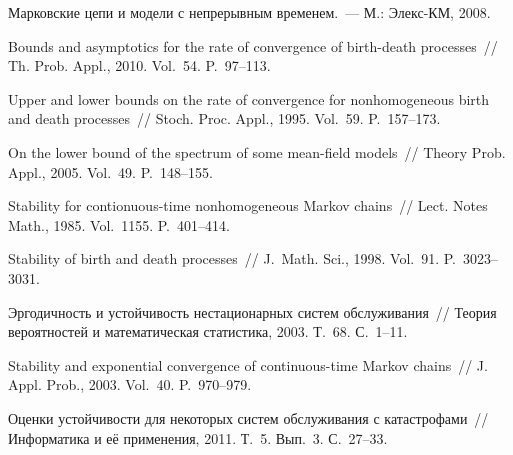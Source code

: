 \begin{multicols}{2}
{{\begin{thebibliography}{99}
Марковские цепи и модели с непрерывным временем.~--- М.: Элекс-КМ, 2008.

Bounds and asymptotics for the rate of convergence of birth-death processes~//  
Th. Prob. Appl., 2010. Vol.~54. P.~97--113.

 Upper and lower bounds on the rate of
convergence for nonhomogeneous birth and death processes~//  Stoch.
Proc. Appl., 1995. Vol.~59. P.~157--173.

 On the lower bound of the spectrum
 of some mean-field models~// Theory Prob. Appl., 2005. Vol.~49. P.~148--155.
 
 Stability for contionuous-time
nonhomogeneous Markov chains~// Lect. Notes Math.,  1985. Vol.~1155.
P.~401--414.

 Stability of birth and death processes~// 
J.~Math. Sci., 1998. Vol.~91. P.~3023--3031.

Эргодичность и устойчивость нестационарных систем обслуживания~//
Теория вероятностей и математическая статистика, 2003. Т.~68.
С.~1--11.

 Stability and exponential convergence of continuous-time 
Markov chains~//  J. Appl. Prob., 2003. Vol.~40. P.~970--979.

\label{end\stat} 

Оценки устойчивости  для некоторых систем обслуживания с катастрофами~//  
Информатика и её применения, 2011. Т.~5. Вып.~3. С.~27--33.
 \end{thebibliography}
}
}


\end{multicols}       